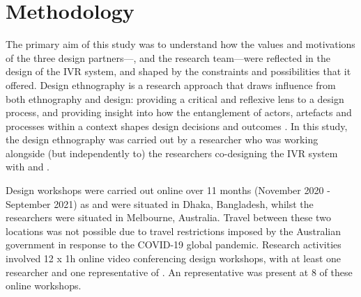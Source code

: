 \section{Methodology}

The primary aim of this study was to understand how the values and motivations of the three design partners---\NGO{}, \PC{} and the research team---were reflected in the design of the IVR system, and shaped by the constraints and possibilities that it offered. Design ethnography is a research approach that draws influence from both ethnography and design: providing a critical and reflexive lens to a design process, and providing insight into how the entanglement of actors, artefacts and processes within a context shapes design decisions and outcomes \cite{akama2015, smith2016}. In this study, the design ethnography was carried out by a researcher who was working alongside (but independently to) the researchers co-designing the IVR system with \NGO{} and \PC{}. 

Design workshops were carried out online over 11 months (November 2020 - September 2021) as \PC{} and \NGO{} were situated in Dhaka, Bangladesh, whilst the researchers were situated in Melbourne, Australia. Travel between these two locations was not possible due to travel restrictions imposed by the Australian government in response to the COVID-19 global pandemic. Research activities involved 12 x 1h online video conferencing design workshops, with at least one researcher and one representative of \PC{}. An \NGO{} representative was present at 8 of these online workshops. 

